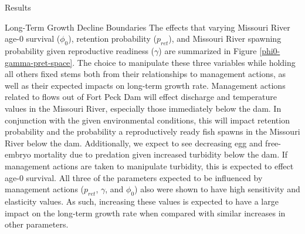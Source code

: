 \documentclass[12pt]{article}
\begin{document}
\begin{section}{Results}
\begin{subsection}{Long-Term Growth Decline Boundaries}
The effects that varying Missouri River age-0 survival ($\phi_0$), retention probability ($p_{ret}$), and Missouri River spawning probability given reproductive readiness ($\gamma$) are summarized in Figure \ref{phi0-gamma-pret-space}.  The choice to manipulate these three variables while holding all others fixed stems both from their relationships to management actions, as well as their expected impacts on long-term growth rate.  Management actions related to flows out of Fort Peck Dam will effect discharge and temperature values in the Missouri River, especially those immediately below the dam.  In conjunction with the given environmental conditions, this will impact retention probability and the probability a reproductively ready fish spawns in the Missouri River below the dam.  Additionally, we expect to see decreasing egg and free-embryo mortality due to predation given increased turbidity below the dam.  If management actions are taken to manipulate turbidity, this is expected to effect age-0 survival.  All three of the parameters expected to be influenced by management actions ($p_{ret}$, $\gamma$, and $\phi_0$) also were shown to have high sensitivity and elasticity values.  As such, increasing these values is expected to have a large impact on the long-term growth rate when compared with similar increases in other parameters.\\


\end{subsection}
\end{section}
\end{document}
